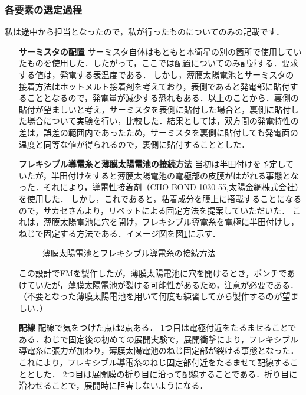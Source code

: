 \subsubsection*{各要素の選定過程}
私は途中から担当となったので，私が行ったものについてのみの記載です．
\begin{itemize}
	\item [\textbf{サーミスタの配置}]
	サーミスタ自体はもともと本衛星の別の箇所で使用していたものを使用した．したがって，ここでは配置についてのみ記述する．要求する値は，発電する表温度である．
	しかし，薄膜太陽電池とサーミスタの接着方法はホットメルト接着剤を考えており，表側であると発電部に貼付することとなるので，発電量が減少する恐れもある．以上のことから．裏側の貼付が望ましいと考え，サーミスタを表側に貼付した場合と，裏側に貼付した場合について実験を行い，比較した．結果としては，双方間の発電特性の差は，誤差の範囲内であったため，サーミスタを裏側に貼付しても発電面の温度と同等な値が得られるので，裏側に貼付することとした．\\
	\item [\textbf{フレキシブル導電糸と薄膜太陽電池の接続方法}]
	当初は半田付けを予定していたが，半田付けをすると薄膜太陽電池の電極部の皮膜がはがれる事態となった．それにより，導電性接着剤（CHO-BOND 1030-55,太陽金網株式会社）を使用した．
	しかし，これであると，粘着成分を膜上に搭載することになるので，サカセさんより，リベットによる固定方法を提案していただいた．
	これは，薄膜太陽電池に穴を開け，フレキシブル導電糸を電極に半田付けし，ねじで固定する方法である．イメージ図を図\ref{fig3-9-3-2}に示す．\\
	\begin{figure}[H]
		\centering
		\caption{薄膜太陽電池とフレキシブル導電糸の接続方法}
		\label{fig3-9-3-2}
	\end{figure}
	この設計でFMを製作したが，薄膜太陽電池に穴を開けるとき，ポンチであけていたが，薄膜太陽電池が裂ける可能性があるため，注意が必要である．（不要となった薄膜太陽電池を用いて何度も練習してから製作するのが望ましい．）\\
	\item [\textbf{配線}]
	配線で気をつけた点は2点ある．
	1つ目は電極付近をたるませることである．ねじで固定後の初めての展開実験で，展開衝撃により，フレキシブル導電糸に張力が加わり，薄膜太陽電池のねじ固定部が裂ける事態となった．これにより，フレキシブル導電糸のねじ固定部付近をたるませて配線することとした．
	2つ目は展開膜の折り目に沿って配線することである．折り目に沿わせることで，展開時に阻害しないようになる．
\end{itemize}


